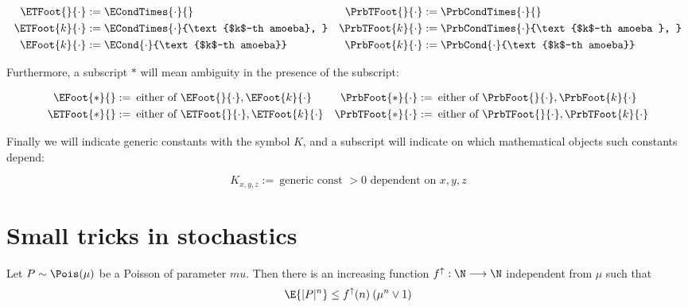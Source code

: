 \begin{align*}
	\ETFoot{}{\cdot}&:=\ECondTimes{\cdot}{}			& 			\PrbTFoot{}{\cdot}&:= \PrbCondTimes{\cdot}{}
	\\
	\ETFoot{k}{\cdot}&:=\ECondTimes{\cdot}{\text{$k$-th amoeba},	}			&				\PrbTFoot{k}{\cdot}&:= \PrbCondTimes{\cdot}{\text{$k$-th amoeba }, }
	\\
	\EFoot{k}{\cdot}&:=\ECond{\cdot}{\text{$k$-th amoeba}}				&				\PrbFoot{k}{\cdot}&:=\PrbCond{\cdot}{\text{$k$-th amoeba}}
\end{align*}

Furthermore, a subscript $\ast$ will mean ambiguity in the presence of the subscript:

\begin{align*}
	\EFoot{\ast}{} &:=  \: \text{either of }	\EFoot{}{\cdot}, \EFoot{k}{\cdot}				&		\PrbFoot{\ast}{\cdot}&:= \: \text{either of }	\PrbFoot{}{\cdot}, \PrbFoot{k}{\cdot}		
	\\
	\ETFoot{\ast}{} &:=  \: \text{either of }	\ETFoot{}{\cdot}, \ETFoot{k}{\cdot}			&		\PrbTFoot{\ast}{\cdot}&:= \: \text{either of }	\PrbTFoot{}{\cdot}, \PrbTFoot{k}{\cdot}		
\end{align*}

Finally we will indicate generic constants with the symbol $K$, and a subscript will indicate on which mathematical objects such constants depend:

\begin{equation*}
	K_{x,y,z}:= \: \text{generic const $>0$ dependent on $x,y,z$}
\end{equation*}


\section{Small tricks in stochastics}

\begin{lemma}
	\label{app:Poisson-moments}
	Let $P \sim \Pois(\mu)$ be a Poisson \rv of parameter $mu$.
	Then there is an increasing function $f^{\uparrow}: \N \longrightarrow \N$ independent from $\mu$ such that 
	\begin{equation*}
		\E{|P|^n} \leq  f^{\uparrow}(n)\: (\mu^n \vee 1)
	\end{equation*}
\end{lemma}

